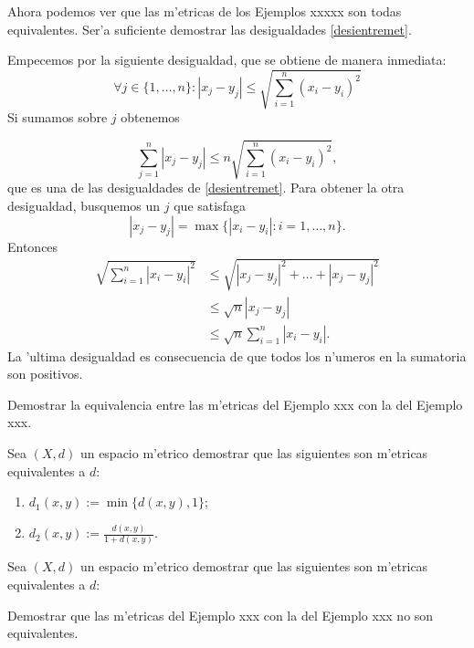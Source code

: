 Ahora podemos ver que las m'etricas de los Ejemplos xxxxx son
todas equivalentes. Ser'a suficiente demostrar las desigualdades
\eqref{desientremet}.

Empecemos por la siguiente desigualdad, que se obtiene de manera
inmediata:
\[
\forall j\in\{1,\dots,n\}:|x_j-y_j|\leq
\sqrt{\sum\limits_{i=1}^n(x_i-y_i)^2}
\]
Si sumamos sobre $j$ obtenemos

\[
\sum\limits_{j=1}^n|x_j-y_j|\leq n
\sqrt{\sum\limits_{i=1}^n(x_i-y_i)^2},
\]
que es una de las desigualdades de \eqref{desientremet}. Para
obtener la otra desigualdad, busquemos un $j$ que satisfaga
\[
    |x_j-y_j|=\max\{|x_i-y_i|:i=1,\ldots,n\}.
\]
Entonces
\[
\begin{split}
    \sqrt{\sum\limits_{i=1}^n|x_i-y_i|^2}
               &\leq \sqrt{|x_j-y_j|^2+\dots+|x_j-y_j|^2}\\
               &\leq \sqrt{n}|x_j-y_j|\\
               &\leq \sqrt{n}\sum\limits_{i=1}^n|x_i-y_i|.
\end{split}
\]
La 'ultima desigualdad es consecuencia de que todos los n'umeros
en la sumatoria son positivos.

\begin{ejercicio} Demostrar la equivalencia entre las m'etricas
del Ejemplo xxx con la del Ejemplo xxx.
\end{ejercicio}

\begin{ejercicio} Sea $(X,d)$ un espacio m'etrico demostrar que
las siguientes son m'etricas equivalentes a $d$:
\begin{enumerate}
\item $d_1(x,y):=\min\{d(x,y),1\}$;
\item $d_2(x,y):=\frac{d(x,y)}{1+d(x,y)}$.
\end{enumerate}
\end{ejercicio}

\begin{ejercicio} Sea $(X,d)$ un espacio m'etrico demostrar que
las siguientes son m'etricas equivalentes a $d$:
\end{ejercicio}

\begin{ejercicio} Demostrar que las m'etricas
del Ejemplo xxx con la del Ejemplo xxx no son equivalentes.
\end{ejercicio}


